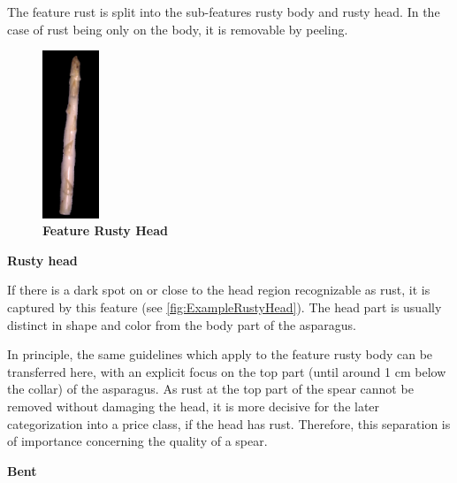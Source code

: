 The feature rust is split into the sub-features rusty body and rusty head. In the case of rust being only on the body, it is removable by peeling.

\vspace{5cm}

\begin{figure}
  \vspace{-30pt}
  \begin{center}
    \includegraphics[width=0.15\textwidth]{Figures/chapter03/example_img_rustyhead.png}
  \end{center}
  \vspace{-15pt}
  \caption[Example Image Feature Rusty Head]{ \textbf{Feature Rusty Head}}
  \vspace{-10pt}
  \label{fig:ExampleRustyHead}
\end{figure}

\textbf{Rusty head}

If there is a dark spot on or close to the head region recognizable as rust, it is captured by this feature (see \autoref{fig:ExampleRustyHead}). The head part is usually distinct in shape and color from the body part of the asparagus.

In principle, the same guidelines which apply to the feature rusty body can be transferred here, with an explicit focus on the top part (until around 1 cm below the collar) of the asparagus. As rust at the top part of the spear cannot be removed without damaging the head, it is more decisive for the later categorization into a price class, if the head has rust. Therefore, this separation is of importance concerning the quality of a spear.

\bigskip
\textbf{Bent}

